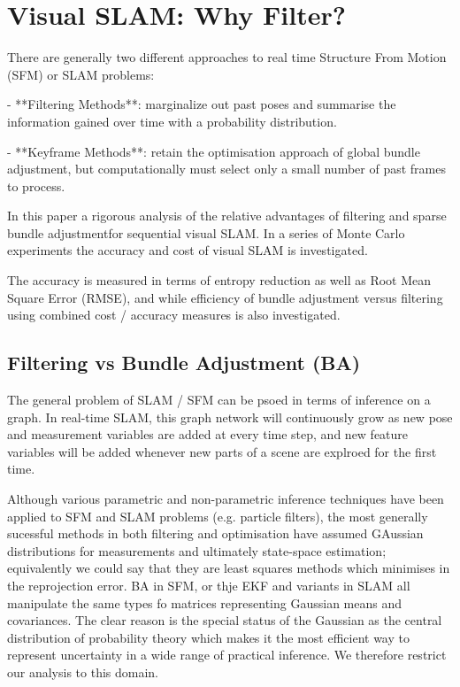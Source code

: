 \section{Visual SLAM: Why Filter?}

There are generally two different approaches to real time Structure From Motion
(SFM) or SLAM problems:

- **Filtering Methods**: marginalize out past poses and summarise the
  information gained over time with a probability distribution.

- **Keyframe Methods**: retain the optimisation approach of global bundle
  adjustment, but computationally must select only a small number of past
  frames to process.

In this paper a rigorous analysis of the relative advantages of filtering and
sparse bundle adjustmentfor sequential visual SLAM. In a series of Monte Carlo
experiments the accuracy and cost of visual SLAM is investigated.

The accuracy is measured in terms of entropy reduction as well as Root Mean
Square Error (RMSE), and while efficiency of bundle adjustment versus filtering
using combined cost / accuracy measures is also investigated.


\subsection{Filtering vs Bundle Adjustment (BA)}

The general problem of SLAM / SFM can be psoed in terms of inference on a
graph. In real-time SLAM, this graph network will continuously grow as new pose
and measurement variables are added at every time step, and new feature
variables will be added whenever new parts of a scene are explroed for the
first time.

Although various parametric and non-parametric inference techniques have been
applied to SFM and SLAM problems (e.g. particle filters), the most generally
sucessful methods in both filtering and optimisation have assumed GAussian
distributions for measurements and ultimately state-space estimation;
equivalently we could say that they are least squares methods which minimises
in the reprojection error. BA in SFM, or thje EKF and variants in SLAM all
manipulate the same types fo matrices representing Gaussian means and
covariances. The clear reason is the special status of the Gaussian as the
central distribution of probability theory which makes it the most efficient
way to represent uncertainty in a wide range of practical inference. We
therefore restrict our analysis to this domain.

